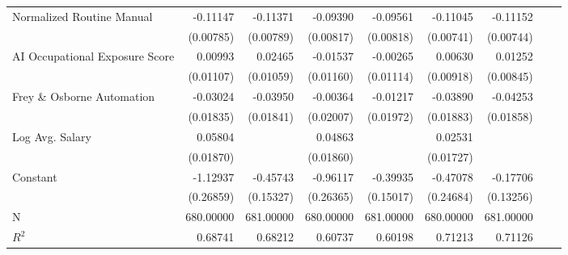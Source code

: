 {\begin{tabular}{l*{8}{D{.}{.}{-1}}}
\addlinespace
Normalized Routine Manual&    -0.11147\sym{***}&    -0.11371\sym{***}&    -0.09390\sym{***}&    -0.09561\sym{***}&    -0.11045\sym{***}&    -0.11152\sym{***}\\
                    &   (0.00785)         &   (0.00789)         &   (0.00817)         &   (0.00818)         &   (0.00741)         &   (0.00744)         \\
\addlinespace
AI Occupational Exposure Score     &     0.00993         &     0.02465\sym{**} &    -0.01537         &    -0.00265         &     0.00630         &     0.01252         \\
                    &   (0.01107)         &   (0.01059)         &   (0.01160)         &   (0.01114)         &   (0.00918)         &   (0.00845)         \\
\addlinespace
Frey \& Osborne Automation&    -0.03024\sym{*}  &    -0.03950\sym{**} &    -0.00364         &    -0.01217         &    -0.03890\sym{**} &    -0.04253\sym{**} \\
                    &   (0.01835)         &   (0.01841)         &   (0.02007)         &   (0.01972)         &   (0.01883)         &   (0.01858)         \\
\addlinespace
Log Avg. Salary     &     0.05804\sym{***}&                     &     0.04863\sym{***}&                     &     0.02531         &                     \\
                    &   (0.01870)         &                     &   (0.01860)         &                     &   (0.01727)         &                     \\
\addlinespace
Constant            &    -1.12937\sym{***}&    -0.45743\sym{***}&    -0.96117\sym{***}&    -0.39935\sym{***}&    -0.47078\sym{*}  &    -0.17706         \\
                    &   (0.26859)         &   (0.15327)         &   (0.26365)         &   (0.15017)         &   (0.24684)         &   (0.13256)         \\
\midrule
N                   &   680.00000         &   681.00000         &   680.00000         &   681.00000         &   680.00000         &   681.00000         \\
$R^2$                  &     0.68741         &     0.68212         &     0.60737         &     0.60198         &     0.71213         &     0.71126         \\
\bottomrule
\end{tabular}
}
